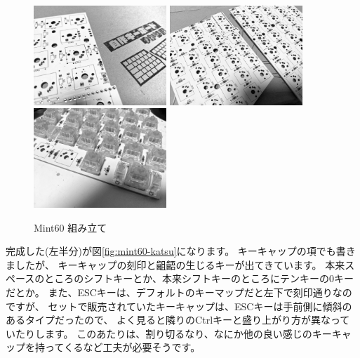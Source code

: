 \documentclass[mingoth,a4paper]{jsarticle}
\begin{document}
\begin{figure}[htbp]
 \begin{center}
  \includegraphics[keepaspectratio,width=5cm]{./image201911-kansai-02/mint60-build-01.jpg}
  \hspace*{2zw}
  \includegraphics[keepaspectratio,width=5cm]{./image201911-kansai-02/mint60-build-02.jpg}
  \hspace*{2zw}
  \includegraphics[keepaspectratio,width=5cm]{./image201911-kansai-02/mint60-build-03.jpg}
 \end{center}
 \vspace*{-1zw}
 \caption{Mint60 組み立て}
 \label{fig:mint60-katsu-build}
\end{figure}

完成した(左半分)が図\ref{fig:mint60-katsu}になります。
キーキャップの項でも書きましたが、
キーキャップの刻印と齟齬の生じるキーが出てきています。
本来スペースのところのシフトキーとか、本来シフトキーのところにテンキーの0キーだとか。
また、ESCキーは、デフォルトのキーマップだと左下で刻印通りなのですが、
セットで販売されていたキーキャップは、ESCキーは手前側に傾斜のあるタイプだったので、
よく見ると隣りのCtrlキーと盛り上がり方が異なっていたりします。
このあたりは、割り切るなり、なにか他の良い感じのキーキャップを持ってくるなど工夫が必要そうです。
\end{document}
